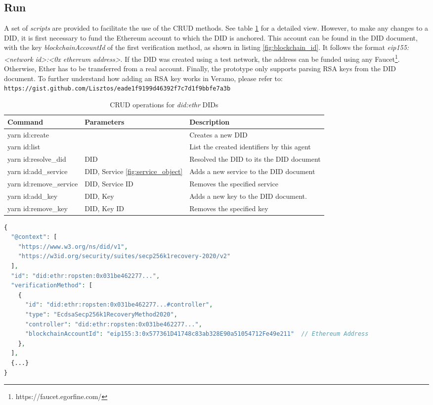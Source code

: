 \subsection{Run}
A set of \emph{scripts} are provided to facilitate the use of the CRUD methods. See table \ref{table:yarn_scripts} for a detailed view. However, to make any changes to a DID, it is first necessary to fund the Ethereum account to which the DID is anchored. This account can be found in the DID document, with the key \emph{blockchainAccountId} of the first verification method, as shown in listing \ref{fig:blockchain_id}. It follows the format  \emph{eip155:<network id>:<0x ethereum address>}. If the DID was created using a test network, the address can be funded using any Faucet\footnote{https://faucet.egorfine.com/}. Otherwise, Ether has to be transferred from a real account.
Finally, the prototype only supports parsing RSA keys from the DID document. To further understand how adding an RSA key works in Veramo, please refer to:\\
 \verb|https://gist.github.com/Lisztos/eade1f9199d46392f7c7d1f9bbfe7a3b|


\begin{table}[H]
  \centering
  \begin{tabular}{|p{4cm}|p{3cm}|p{7cm}| }
    \hline
    Command & Parameters & Description \\
    \hline
    \hline
    yarn id:create & & Creates a new DID \\
    \hline
    yarn id:list & & List the created identifiers by this agent \\
    \hline
    yarn id:resolve\_did & DID & Resolved the DID to its the DID document \\
    \hline
    yarn id:add\_service & DID,  Service \ref{fig:service_object} & Adds a new service to the DID document \\
    \hline
    yarn id:remove\_service & DID, Service ID & Removes the specified service\\
    \hline
    yarn id:add\_key & DID, Key & Adds a new key to the DID document. \\
    \hline
    yarn id:remove\_key & DID, Key ID & Removes the specified key\\
    \hline
  \end{tabular}
  \caption{CRUD operations for \emph{did:ethr} DIDs}
  \label{table:yarn_scripts}
\end{table}

\lstset{style=JSONStyle}
\begin{lstlisting}[language=PHP, caption=Controller address inside the DID document, label=fig:blockchain_id, float=h]
  {
  "@context": [
    "https://www.w3.org/ns/did/v1",
    "https://w3id.org/security/suites/secp256k1recovery-2020/v2"
  ],
  "id": "did:ethr:ropsten:0x031be462277...",
  "verificationMethod": [
    {
      "id": "did:ethr:ropsten:0x031be462277...#controller",
      "type": "EcdsaSecp256k1RecoveryMethod2020",
      "controller": "did:ethr:ropsten:0x031be462277...",
      "blockchainAccountId": "eip155:3:0x577361D41748c83ab328E90a51054712Fe49e211"  // Ethereum Address
    },
  ],
  {...}
}
\end{lstlisting}

